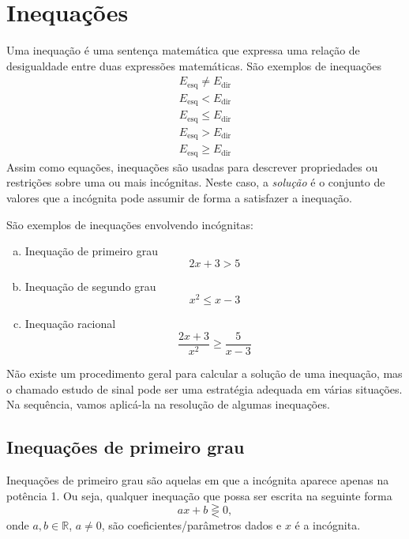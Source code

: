 \section{Inequações}\label{cap_ineq_sec_ineq}

Uma inequação é uma sentença matemática que expressa uma relação de desigualdade entre duas expressões matemáticas. São exemplos de inequações
\begin{gather}
  E_{\text{esq}} \neq E_{\text{dir}}\\
  E_{\text{esq}} < E_{\text{dir}}\\
  E_{\text{esq}} \leq E_{\text{dir}}\\
  E_{\text{esq}} > E_{\text{dir}}\\
  E_{\text{esq}} \geq E_{\text{dir}}
\end{gather}
Assim como equações, inequações são usadas para descrever propriedades ou restrições sobre uma ou mais incógnitas. Neste caso, a \emph{solução} é o conjunto de valores que a incógnita pode assumir de forma a satisfazer a inequação.

\begin{ex}
  São exemplos de inequações envolvendo incógnitas:
  \begin{enumerate}[a)]
  \item Inequação de primeiro grau
    \begin{equation}
      2x + 3 > 5
    \end{equation}
  \item Inequação de segundo grau
    \begin{equation}
      x^2 \leq x - 3
    \end{equation}
  \item Inequação racional
    \begin{equation}
      \frac{2x + 3}{x^2} \geq \frac{5}{x-3}
    \end{equation}
  \end{enumerate}
\end{ex}

Não existe um procedimento geral para calcular a solução de uma inequação, mas o chamado estudo de sinal pode ser uma estratégia adequada em várias situações. Na sequência, vamos aplicá-la na resolução de algumas inequações.

\subsection{Inequações de primeiro grau}

Inequações de primeiro grau são aquelas em que a incógnita aparece apenas na potência 1. Ou seja, qualquer inequação que possa ser escrita na seguinte forma
\begin{equation}\label{eq:ineq_g1}
  ax + b \gtreqless 0,
\end{equation}
onde $a,b\in\mathbb{R}$, $a\neq 0$, são coeficientes/parâmetros dados e $x$ é a incógnita.

